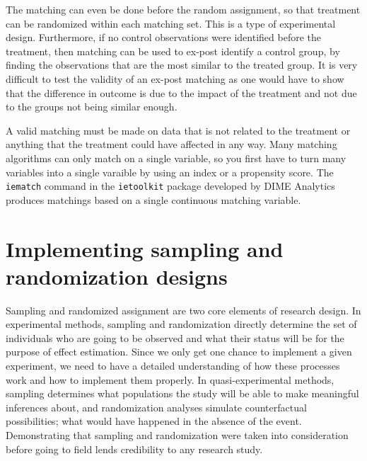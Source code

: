 The matching can even be done before the random assignment,
so that treatment can be randomized within each matching set.
This is a type of experimental design.
Furthermore, if no control observations were identified before the treatment,
then matching can be used to ex-post identify a control group,
by finding the observations that are the most similar to the treated group.
It is very difficult to test the validity of an ex-post matching
as one would have to show that the difference in outcome is
due to the impact of the treatment and not due to the groups not being similar enough.

A valid matching must be made on data that is not related to the treatment
or anything that the treatment could have affected in any way.
Many matching algorithms can only match on a single variable,
so you first have to turn many variables into a single varaible
by using an index or a propensity score.
The \texttt{iematch}
command in the \texttt{ietoolkit} package developed by DIME Analytics
produces matchings based on a single continuous matching variable.

\section{Implementing sampling and randomization designs}

	Sampling and randomized assignment are two core elements of research design.
	In experimental methods, sampling and randomization directly determine
	the set of individuals who are going to be observed
	and what their status will be for the purpose of effect estimation.
	Since we only get one chance to implement a given experiment,
	we need to have a detailed understanding of how these processes work
	and how to implement them properly.
	In quasi-experimental methods, sampling determines what populations the study
	will be able to make meaningful inferences about,
	and randomization analyses simulate counterfactual possibilities;
	what would have happened in the absence of the event.
	Demonstrating that sampling and randomization were taken into consideration
	before going to field lends credibility to any research study.

